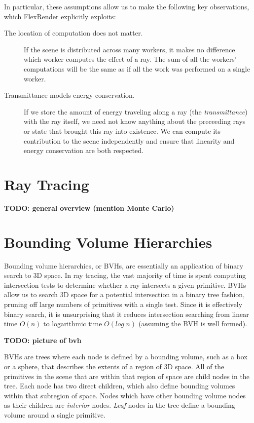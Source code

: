 \documentclass[12pt]{ucthesis}
\begin{document}
In particular, these assumptions allow us to make the following key
observations, which FlexRender explicitly exploits:

\begin{description}
    \item[The location of computation does not matter.] If the scene is
        distributed across many workers, it makes no difference which worker
        computes the effect of a ray. The sum of all the workers' computations
        will be the same as if all the work was performed on a single worker.
    \item[Transmittance models energy conservation.] If we store the amount of
        energy traveling along a ray (the \emph{transmittance}) with the ray
        itself, we need not know anything about the preceeding rays or state
        that brought this ray into existence. We can compute its contribution
        to the scene independently and ensure that linearity and energy
        conservation are both respected.
\end{description}

\section{Ray Tracing}
\label{raytracing}

\textbf{TODO: general overview (mention Monte Carlo)}

\section{Bounding Volume Hierarchies}
\label{bvhs}

Bounding volume hierarchies, or BVHs, are essentially an application of binary
search to 3D space. In ray tracing, the vast majority of time is spent
computing intersection tests to determine whether a ray intersects a given
primitive. BVHs allow us to search 3D space for a potential intersection in a
binary tree fashion, pruning off large numbers of primitives with a single
test. Since it is effectively binary search, it is unsurprising that it reduces
intersection searching from linear time $O(n)$ to logarithmic time $O(log\;n)$
(assuming the BVH is well formed).

\textbf{TODO: picture of bvh}

BVHs are trees where each node is defined by a bounding volume, such as a box
or a sphere, that describes the extents of a region of 3D space. All of the
primitives in the scene that are within that region of space are child nodes
in the tree. Each node has two direct children, which also define bounding
volumes within that subregion of space. Nodes which have other bounding volume
nodes as their children are \emph{interior} nodes. \emph{Leaf} nodes in the tree
define a bounding volume around a single primitive.
\end{document}
